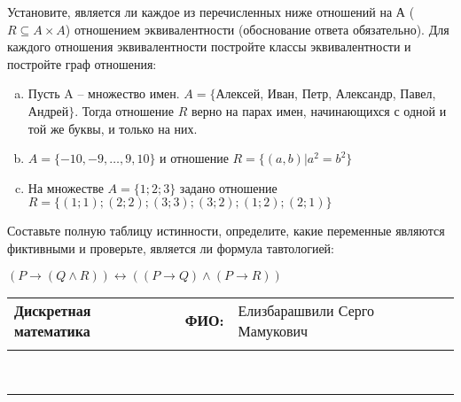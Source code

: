 \documentclass[10pt]{exam}
\newcommand{\class}{Дискретная математика}
\newcommand{\examdate}{}
\begin{document}
\begin{questions}
\question
Установите, является ли каждое из перечисленных ниже отношений на А ($R \subseteq A \times A$) отношением эквивалентности (обоснование ответа обязательно). Для каждого отношения эквивалентности постройте классы 
эквивалентности и постройте граф отношения:
\begin{enumerate} [a)]\setcounter{enumi}{0}
\item Пусть A – множество имен. $A = \{ $Алексей, Иван, Петр, Александр, Павел, Андрей$ \}$. Тогда отношение $R$ верно на парах имен, начинающихся с одной и той же буквы, и только на них.
\item $A = \{-10, -9, … , 9, 10\}$ и отношение $ R = \{(a,b)|a^{2} = b^{2}\}$
\item На множестве $A = \{1; 2; 3\}$ задано отношение $R = \{(1; 1); (2; 2); (3; 3); (3; 2); (1; 2); (2; 1)\}$
\end{enumerate}\question Составьте полную таблицу истинности, определите, какие переменные являются фиктивными и проверьте, является ли формула тавтологией:

$(P \rightarrow (Q \land R)) \leftrightarrow ((P \rightarrow Q) \land (P \rightarrow R))$

\end{questions}
\newpage
\begin{flushright}
\begin{tabular}{p{2.8in} r l}
\textbf{\class} & \textbf{ФИО:} &Елизбарашвили Серго Мамукович
\\

\textbf{\examdate} &&\\
\end{tabular}\\
\end{flushright}
\rule[1ex]{\textwidth}{.1pt}
\end{document}

